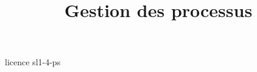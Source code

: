 \documentclass {beamer}
\title {Gestion des processus}
\begin{document}
 {licence}
 {sl1-4-ps}
\end{document}
